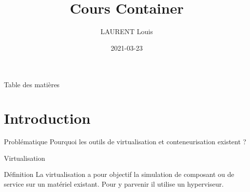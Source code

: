 \documentclass[11pt]{beamer}
\author{LAURENT Louis}
\title{Cours Container}
\date{2021-03-23}
\begin{document}
\begin{frame}
\titlepage
\end{frame}

\begin{frame}{Table des matières}
\tableofcontents
\end{frame}


\section{Introduction}
\begin{frame}{Problématique}
Pourquoi les outils de virtualisation et conteneurisation existent ?
\end{frame}

\begin{frame}{Virtualisation}
\begin{block}{Définition}
La virtualisation a pour objectif la simulation de composant ou de service sur un matériel existant. Pour y parvenir il utilise un hyperviseur.
\end{block}
\end{frame}
\end{document}
